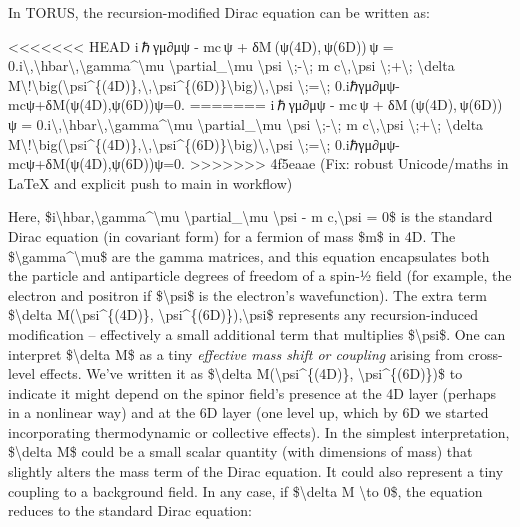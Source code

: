 \documentclass[]{article}
\begin{document}
In TORUS, the recursion-modified Dirac equation can be written as:

<<<<<<< HEAD
i ℏ γμ∂μψ  -  mc ψ  +  δM ⁣(ψ(4D), ψ(6D)) ψ  =  0.i\textbackslash,\textbackslash hbar\textbackslash,\textbackslash gamma\^{}\textbackslash mu
\textbackslash partial\_\textbackslash mu \textbackslash psi
\textbackslash;-\textbackslash; m c\textbackslash,\textbackslash psi
\textbackslash;+\textbackslash; \textbackslash delta
M\textbackslash!\textbackslash big(\textbackslash psi\^{}\{(4D)\},\textbackslash,\textbackslash psi\^{}\{(6D)\}\textbackslash big)\textbackslash,\textbackslash psi
\textbackslash;=\textbackslash;
0.iℏγμ∂μ\hspace{0pt}ψ-mcψ+δM(ψ(4D),ψ(6D))ψ=0.
=======
i ℏ γμ∂μψ  -  mc ψ  +  δM ⁣(ψ(4D), ψ(6D)) ψ  =  0.i\textbackslash{},\textbackslash{}hbar\textbackslash{},\textbackslash{}gamma\^{}\textbackslash{}mu
\textbackslash{}partial\_\textbackslash{}mu \textbackslash{}psi
\textbackslash{};-\textbackslash{}; m
c\textbackslash{},\textbackslash{}psi
\textbackslash{};+\textbackslash{}; \textbackslash{}delta
M\textbackslash{}!\textbackslash{}big(\textbackslash{}psi\^{}\{(4D)\},\textbackslash{},\textbackslash{}psi\^{}\{(6D)\}\textbackslash{}big)\textbackslash{},\textbackslash{}psi
\textbackslash{};=\textbackslash{}; 0.iℏγμ∂μ​ψ-mcψ+δM(ψ(4D),ψ(6D))ψ=0.
>>>>>>> 4f5eaae (Fix: robust Unicode/maths in LaTeX and explicit push to main in workflow)

Here,
\$i\textbackslash{}hbar,\textbackslash{}gamma\^{}\textbackslash{}mu
\textbackslash{}partial\_\textbackslash{}mu \textbackslash{}psi - m
c,\textbackslash{}psi = 0\$ is the standard Dirac equation (in covariant
form) for a fermion of mass \$m\$ in 4D. The
\$\textbackslash{}gamma\^{}\textbackslash{}mu\$ are the gamma matrices,
and this equation encapsulates both the particle and antiparticle
degrees of freedom of a spin-½ field (for example, the electron and
positron if \$\textbackslash{}psi\$ is the electron's wavefunction). The
extra term \$\textbackslash{}delta M(\textbackslash{}psi\^{}\{(4D)\},
\textbackslash{}psi\^{}\{(6D)\}),\textbackslash{}psi\$ represents any
recursion-induced modification -- effectively a small additional term
that multiplies \$\textbackslash{}psi\$. One can interpret
\$\textbackslash{}delta M\$ as a tiny \emph{effective mass shift or
coupling} arising from cross-level effects. We've written it as
\$\textbackslash{}delta M(\textbackslash{}psi\^{}\{(4D)\},
\textbackslash{}psi\^{}\{(6D)\})\$ to indicate it might depend on the
spinor field's presence at the 4D layer (perhaps in a nonlinear way) and
at the 6D layer (one level up, which by 6D we started incorporating
thermodynamic or collective effects). In the simplest interpretation,
\$\textbackslash{}delta M\$ could be a small scalar quantity (with
dimensions of mass) that slightly alters the mass term of the Dirac
equation. It could also represent a tiny coupling to a background field.
In any case, if \$\textbackslash{}delta M \textbackslash{}to 0\$, the
equation reduces to the standard Dirac equation:
\end{document}
